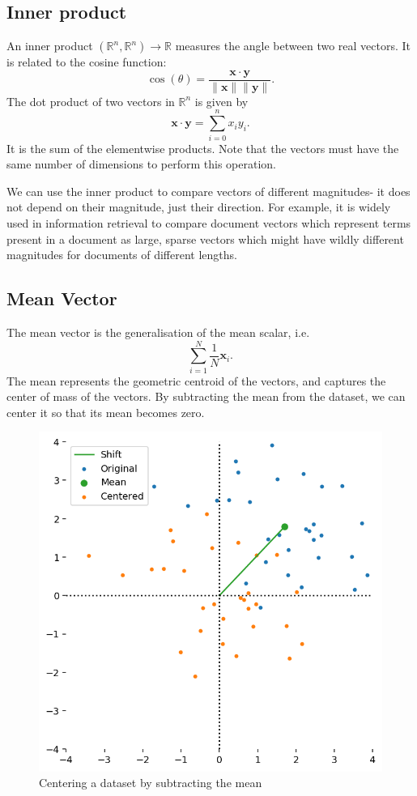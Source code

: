 \documentclass[a4paper, openany]{memoir}
\begin{document}
    \subsection{Inner product}
    An inner product $(\mathbb{R}^n, \mathbb{R}^n) \to \mathbb{R}$ measures the angle between two real vectors. It is related to the cosine function:
    \[\cos (\theta) = \frac{\mathbf{x} \cdot \mathbf{y}}{\lVert \mathbf{x} \rVert \lVert \mathbf{y} \rVert}.\]
    The dot product of two vectors in $\mathbb{R}^n$ is given by
    \[\mathbf{x} \cdot \mathbf{y} = \sum_{i=0}^n x_i y_i.\]
    It is the sum of the elementwise products. Note that the vectors must have the same number of dimensions to perform this operation.

    We can use the inner product to compare vectors of different magnitudes- it does not depend on their magnitude, just their direction. For example, it is widely used in information retrieval to compare document vectors which represent terms present in a document as large, sparse vectors which might have wildly different magnitudes for documents of different lengths.

    \subsection{Mean Vector}
    The mean vector is the generalisation of the mean scalar, i.e.
    \[\sum_{i=1}^N \frac{1}{N} \mathbf{x}_i.\]
    The mean represents the geometric centroid of the vectors, and captures the center of mass of the vectors. By subtracting the mean from the dataset, we can center it so that its mean becomes zero.
    \begin{figure}[H]
        \centering
        \includegraphics[scale=0.55]{src/3.4 Centered Data.png}
        \caption{Centering a dataset by subtracting the mean}
    \end{figure}
\end{document}
